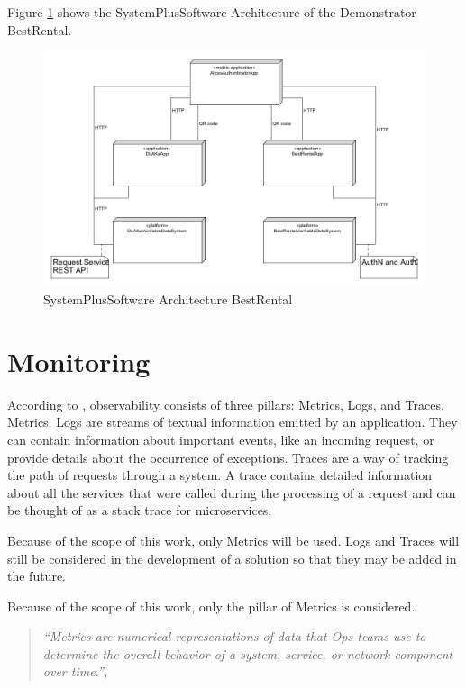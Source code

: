 Figure \ref{fig:sps_architecture_bestrental} shows the SystemPlusSoftware Architecture of the Demonstrator BestRental.

\begin{figure}
	\centering
	\includegraphics[width=\textwidth]{figures/sps_BestRentalPOC.png}
	\caption{SystemPlusSoftware Architecture BestRental}
	\label{fig:sps_architecture_bestrental}
\end{figure}

\section{Monitoring}


According to \cite{9837035}, observability consists of three pillars: Metrics, Logs, and Traces.
Metrics.
Logs are streams of textual information emitted by an application. They can contain information about important
events, like an incoming request, or provide details about the occurrence of exceptions.
Traces are a way of tracking the path of requests through a system. A trace contains detailed information
about all the services that were called during the processing of a request and can be thought of
as a stack trace for microservices.

Because of the scope of this work, only Metrics will be used. Logs and Traces will still be considered
in the development of a solution so that they may be added in the future.

Because of the scope of this work, only the pillar of Metrics is considered.

\begin{quote}
\textit{``Metrics are numerical representations of data that Ops teams use to determine the overall behavior of a system, service, or network component over time.'', \cite{9837035}}
\end{quote}

